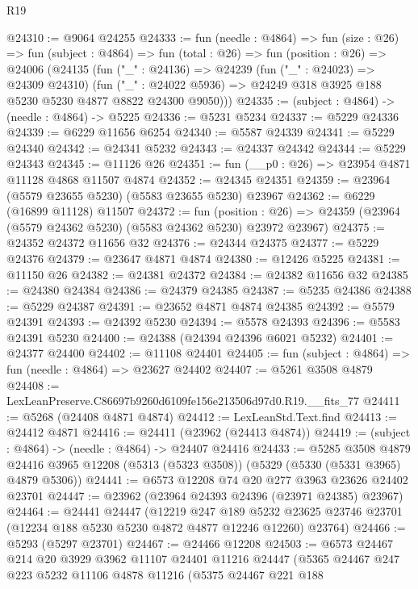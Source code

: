 \begin{lexlean}{R19}
\begin{coremodule}
@24310 := @9064 @24255
@24333 := fun (needle : @4864) =>
  fun (size : @26) =>
  fun (subject : @4864) =>
  fun (total : @26) =>
  fun (position : @26) =>
  @24006
    (@24135
      (fun ("_" : @24136) =>
      @24239
        (fun ("_" : @24023) => @24309 @24310)
        (fun ("_" : @24022 @5936) => @24249 @318 @3925 @188 @5230 @5230 @4877 @8822 @24300 @9050)))
@24335 := (subject : @4864) -> (needle : @4864) -> @5225
@24336 := @5231 @5234
@24337 := @5229 @24336
@24339 := @6229 @11656 @6254
@24340 := @5587 @24339
@24341 := @5229 @24340
@24342 := @24341 @5232
@24343 := @24337 @24342
@24344 := @5229 @24343
@24345 := @11126 @26
@24351 := fun (__p0 : @26) => @23954 @4871 @11128 @4868 @11507 @4874
@24352 := @24345 @24351
@24359 := @23964 (@5579 @23655 @5230) (@5583 @23655 @5230) @23967
@24362 := @6229 (@16899 @11128) @11507
@24372 := fun (position : @26) =>
  @24359 (@23964 (@5579 @24362 @5230) (@5583 @24362 @5230) @23972 @23967)
@24375 := @24352 @24372 @11656 @32
@24376 := @24344 @24375
@24377 := @5229 @24376
@24379 := @23647 @4871 @4874
@24380 := @12426 @5225
@24381 := @11150 @26
@24382 := @24381 @24372
@24384 := @24382 @11656 @32
@24385 := @24380 @24384
@24386 := @24379 @24385
@24387 := @5235 @24386
@24388 := @5229 @24387
@24391 := @23652 @4871 @4874 @24385
@24392 := @5579 @24391
@24393 := @24392 @5230
@24394 := @5578 @24393
@24396 := @5583 @24391 @5230
@24400 := @24388 (@24394 @24396 @6021 @5232)
@24401 := @24377 @24400
@24402 := @11108 @24401
@24405 := fun (subject : @4864) => fun (needle : @4864) => @23627 @24402
@24407 := @5261 @3508 @4879
@24408 := LexLeanPreserve.C86697b9260d6109fe156e213506d97d0.R19.__fits_77
@24411 := @5268 (@24408 @4871 @4874)
@24412 := LexLeanStd.Text.find
@24413 := @24412 @4871
@24416 := @24411 (@23962 (@24413 @4874))
@24419 := (subject : @4864) -> (needle : @4864) -> @24407 @24416
@24433 := @5285
    @3508
    @4879
    @24416
    @3965
    @12208
    (@5313 (@5323 @3508))
    (@5329 (@5330 (@5331 @3965) @4879 @5306))
@24441 := @6573 @12208 @74 @20 @277 @3963 @23626 @24402 @23701
@24447 := @23962 (@23964 @24393 @24396 (@23971 @24385) @23967)
@24464 := @24441
    @24447
    (@12219
      @247
      @189
      @5232
      @23625
      @23746
      @23701
      (@12234 @188 @5230 @5230 @4872 @4877 @12246 @12260)
      @23764)
@24466 := @5293 (@5297 @23701)
@24467 := @24466 @12208
@24503 := @6573
    @24467
    @214
    @20
    @3929
    @3962
    @11107
    @24401
    @11216
    @24447
    (@5365
      @24467
      @247
      @223
      @5232
      @11106
      @4878
      @11216
      (@5375
        @24467
        @221
        @188

\end{coremodule}
\end{lexlean}
